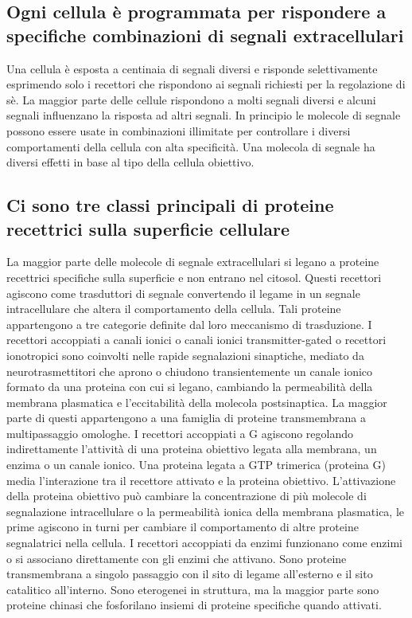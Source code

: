 \subsection{Ogni cellula \`e programmata per rispondere a specifiche combinazioni di segnali extracellulari}
Una cellula \`e esposta a centinaia di segnali diversi e risponde selettivamente esprimendo solo i recettori che rispondono ai segnali richiesti per la regolazione di s\`e. La maggior
parte delle cellule rispondono a molti segnali diversi e alcuni segnali influenzano la risposta ad altri segnali. In principio le molecole di segnale possono essere usate in
combinazioni illimitate per controllare i diversi comportamenti della cellula con alta specificit\`a. Una molecola di segnale ha diversi effetti in base al tipo della cellula
obiettivo. 
\subsection{Ci sono tre classi principali di proteine recettrici sulla superficie cellulare}
La maggior parte delle molecole di segnale extracellulari si legano a proteine recettrici specifiche sulla superficie e non entrano nel citosol. Questi recettori agiscono come
trasduttori di segnale convertendo il legame in un segnale intracellulare che altera il comportamento della cellula. Tali proteine appartengono a tre categorie definite dal loro
meccanismo di trasduzione. I recettori accoppiati a canali ionici o canali ionici transmitter-gated o recettori ionotropici sono coinvolti nelle rapide segnalazioni sinaptiche, mediato
da neurotrasmettitori che aprono o chiudono transientemente un canale ionico formato da una proteina con cui si legano, cambiando la permeabilit\`a della membrana plasmatica e
l'eccitabilit\`a della molecola postsinaptica. La maggior parte di questi appartengono a una famiglia di proteine transmembrana a multipassaggio omologhe. I recettori accoppiati a G 
agiscono regolando indirettamente l'attivit\`a di una proteina obiettivo legata alla membrana, un enzima o un canale ionico. Una proteina legata a GTP trimerica (proteina G) media
l'interazione tra il recettore attivato e la proteina obiettivo. L'attivazione della proteina obiettivo pu\`o cambiare la concentrazione di pi\`u molecole di segnalazione intracellulare
o la permeabilit\`a ionica della membrana plasmatica, le prime agiscono in turni per cambiare il comportamento di altre proteine segnalatrici nella cellula. I recettori accoppiati da
enzimi funzionano come enzimi o si associano direttamente con gli enzimi che attivano. Sono proteine transmembrana a singolo passaggio con il sito di legame all'esterno e il sito 
catalitico all'interno. Sono eterogenei in struttura, ma la maggior parte sono proteine chinasi che fosforilano insiemi di proteine specifiche quando attivati. 
